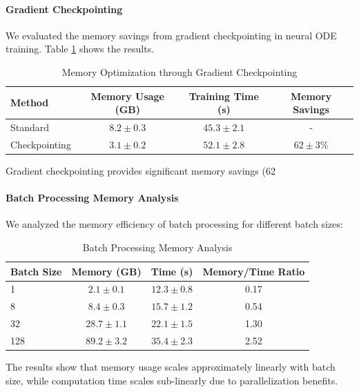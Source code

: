 \paragraph{Gradient Checkpointing}
We evaluated the memory savings from gradient checkpointing in neural ODE training. Table \ref{tab:memory_optimization} shows the results.

\begin{table}[h]
\centering
\caption{Memory Optimization through Gradient Checkpointing}
\label{tab:memory_optimization}
\begin{tabular}{lccc}
\toprule
Method & Memory Usage (GB) & Training Time (s) & Memory Savings \\
\midrule
Standard & $8.2 \pm 0.3$ & $45.3 \pm 2.1$ & - \\
Checkpointing & $3.1 \pm 0.2$ & $52.1 \pm 2.8$ & $62 \pm 3\%$ \\
\bottomrule
\end{tabular}
\end{table}

Gradient checkpointing provides significant memory savings (62%

\paragraph{Batch Processing Memory Analysis}
We analyzed the memory efficiency of batch processing for different batch sizes:

\begin{table}[h]
\centering
\caption{Batch Processing Memory Analysis}
\label{tab:batch_memory}
\begin{tabular}{lccc}
\toprule
Batch Size & Memory (GB) & Time (s) & Memory/Time Ratio \\
\midrule
1 & $2.1 \pm 0.1$ & $12.3 \pm 0.8$ & 0.17 \\
8 & $8.4 \pm 0.3$ & $15.7 \pm 1.2$ & 0.54 \\
32 & $28.7 \pm 1.1$ & $22.1 \pm 1.5$ & 1.30 \\
128 & $89.2 \pm 3.2$ & $35.4 \pm 2.3$ & 2.52 \\
\bottomrule
\end{tabular}
\end{table}

The results show that memory usage scales approximately linearly with batch size, while computation time scales sub-linearly due to parallelization benefits.

